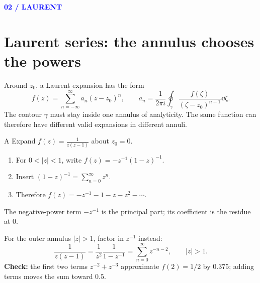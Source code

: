 \documentclass[11pt]{article}
\newcommand{\sectiontag}[1]{\textcolor{blue}{\sffamily\footnotesize\bfseries #1}\par\vspace{2pt}}
\begin{document}
\sectiontag{02 / LAURENT}\section*{Laurent series: the annulus chooses the powers}
Around $z_0$, a Laurent expansion has the form
\[
f(z)=\sum_{n=-\infty}^{\infty}a_n(z-z_0)^n,\qquad a_n=\frac{1}{2\pi i}\oint_\gamma \frac{f(\zeta)}{(\zeta-z_0)^{n+1}}\dd\zeta.
\]
The contour $\gamma$ must stay inside one annulus of analyticity. The same function can therefore have different valid expansions in different annuli.
\begin{worked}{A}
Expand $\displaystyle f(z)=\frac{1}{z(z-1)}$ about $z_0=0$.
\begin{enumerate}[leftmargin=*,itemsep=2pt]
\item For $0<|z|<1$, write $f(z)=-z^{-1}(1-z)^{-1}$.
\item Insert $\displaystyle (1-z)^{-1}=\sum_{n=0}^{\infty}z^n$.
\item Therefore $\displaystyle f(z)=-z^{-1}-1-z-z^2-\cdots$.
\end{enumerate}
The negative-power term $-z^{-1}$ is the principal part; its coefficient is the residue at $0$.
\end{worked}
\begin{orangebox}
For the outer annulus $|z|>1$, factor in $z^{-1}$ instead:
\[
\frac{1}{z(z-1)}=\frac{1}{z^2}\frac{1}{1-z^{-1}}=\sum_{n=0}^{\infty}z^{-n-2},\qquad |z|>1.
\]
\textbf{Check:} the first two terms $z^{-2}+z^{-3}$ approximate $f(2)=1/2$ by $0.375$; adding terms moves the sum toward $0.5$.
\end{orangebox}
\end{document}
